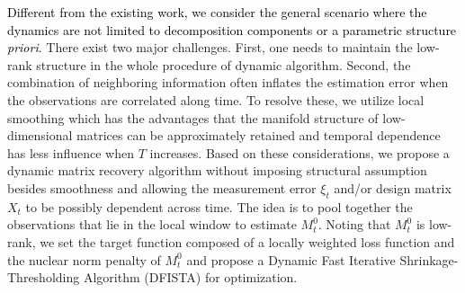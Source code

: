 \documentclass[12pt]{article}
\newcommand{\oldchange}[1]{\textcolor{black}{#1}}
\begin{document}
\oldchange{Different from the existing work, we consider the general scenario  where the dynamics are not limited to decomposition components or a parametric structure {\it priori}.}
There exist two major challenges. First, one needs to maintain the low-rank structure in the whole procedure of dynamic algorithm. Second, the combination of neighboring information often inflates the estimation error when the observations are correlated along time.
To resolve these, we utilize local smoothing which has the advantages that the manifold structure of low-dimensional matrices can be approximately retained and temporal dependence has less influence when $T$ increases. 
Based on these considerations, we propose a dynamic matrix recovery algorithm without imposing structural assumption besides smoothness and allowing the measurement error $\xi_t$ and/or design matrix $X_t$ to be possibly dependent across time.
 The idea is to pool together the observations that lie in the local window to estimate $M_t^0$. Noting that $M_t^0$ is low-rank, we set the target function composed of a locally weighted loss function and the nuclear norm penalty of $M_t^0$ and propose a Dynamic Fast Iterative Shrinkage-Thresholding Algorithm (DFISTA) for optimization. %
 
\end{document}
